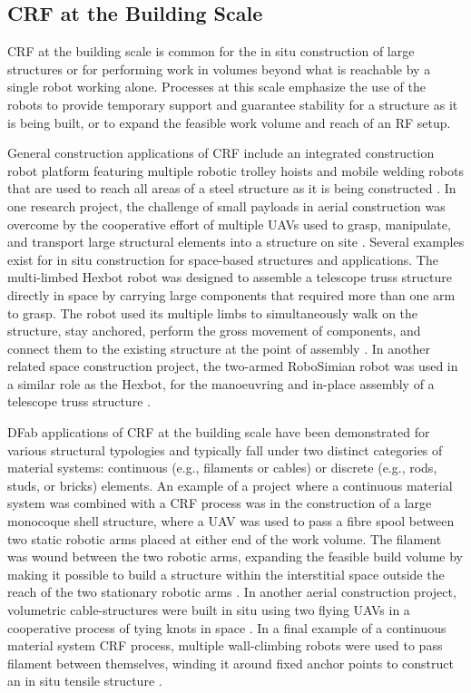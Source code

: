\subsection{CRF at the Building Scale} \label{sec:2_building}
    CRF at the building scale is common for the in situ construction of large structures or for performing work in volumes beyond what is reachable by a single robot working alone. Processes at this scale emphasize the use of the robots to provide temporary support and guarantee stability for a structure as it is being built, or to expand the feasible work volume and reach of an RF setup.

    General construction applications of CRF include an integrated construction robot platform featuring multiple robotic trolley hoists and mobile welding robots that are used to reach all areas of a steel structure as it is being constructed \citep{saidi_robotics_2016}. In one research project, the challenge of small payloads in aerial construction was overcome by the cooperative effort of multiple UAVs used to grasp, manipulate, and transport large structural elements into a structure on site \citep{mellinger_cooperative_2013}. Several examples exist for in situ construction for space-based structures and applications. The multi-limbed Hexbot robot was designed to assemble a telescope truss structure directly in space by carrying large components that required more than one arm to grasp. The robot used its multiple limbs to simultaneously walk on the structure, stay anchored, perform the gross movement of components, and connect them to the existing structure at the point of assembly \citep{lee_architecture_2016}. In another related space construction project, the two-armed RoboSimian robot was used in a similar role as the Hexbot, for the manoeuvring and in-place assembly of a telescope truss structure \citep{karumanchi_payload-centric_2018}.

    DFab applications of CRF at the building scale have been demonstrated for various structural typologies and typically fall under two distinct categories of material systems: continuous (e.g., filaments or cables) or discrete (e.g., rods, studs, or bricks) elements. An example of a project where a continuous material system was combined with a CRF process was in the construction of a large monocoque shell structure, where a UAV was used to pass a fibre spool between two static robotic arms placed at either end of the work volume. The filament was wound between the two robotic arms, expanding the feasible build volume by making it possible to build a structure within the interstitial space outside the reach of the two stationary robotic arms \citep{felbrich_multi-machine_2017, vasey_physically_2020}. In another aerial construction project, volumetric cable-structures were built in situ using two flying UAVs in a cooperative process of tying knots in space \citep{mirjan_architectural_2013,mirjan_building_2016}. In a final example of a continuous material system CRF process, multiple wall-climbing robots were used to pass filament between themselves, winding it around fixed anchor points to construct an in situ tensile structure \citep{yablonina_distributed_2019}.

